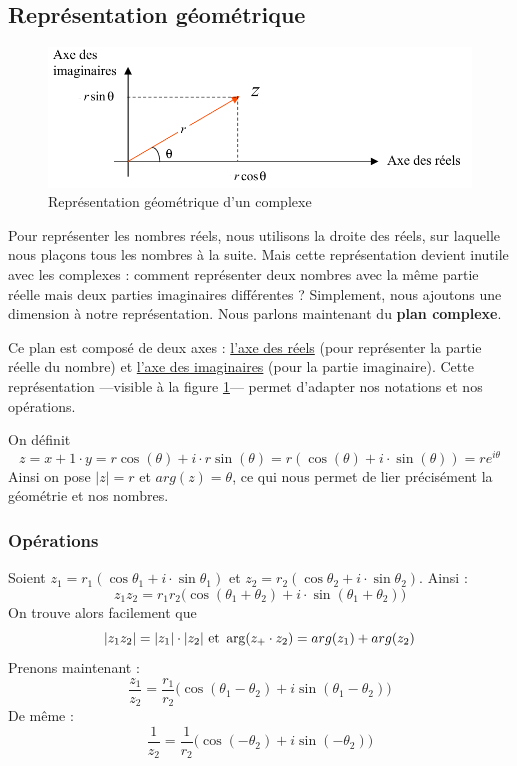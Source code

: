 \documentclass[12pt,a4paper]{article}
\begin{document}
\subsection{Représentation géométrique}
\begin{figure}
	\centering
	\includegraphics[scale=0.5]{images/geo_complexe}
	\caption{Représentation géométrique d'un complexe}
	\label{fig: repres geom complexe}
\end{figure}
Pour représenter les nombres réels, nous utilisons la droite des réels, sur laquelle nous plaçons tous les nombres à la suite. Mais cette représentation devient inutile avec les complexes : comment représenter deux nombres avec la même partie réelle mais deux parties imaginaires différentes ? Simplement, nous ajoutons une dimension à notre représentation. Nous parlons maintenant du \textbf{plan complexe}.

Ce plan est composé de deux axes : \uline{l'axe des réels} (pour représenter la partie réelle du nombre) et \uline{l'axe des imaginaires} (pour la partie imaginaire). Cette représentation ---visible à la figure \ref{fig: repres geom complexe}--- permet d'adapter nos notations et nos opérations.

\begin{boite}
On définit 
\[z = x + 1 \cdot y = r\cos(\theta) + i\cdot r\sin(\theta) = r(\cos(\theta) + i\cdot \sin(\theta)) = re^{i\theta}\]
Ainsi on pose $|z| = r$ et $arg(z) = \theta$, ce qui nous permet de lier précisément la géométrie et nos nombres.
\end{boite}
\subsubsection{Opérations}
Soient $z_1 = r_1(\cos\theta_1 + i\cdot \sin\theta_1)$ et $z_2 = r_2(\cos\theta_2 + i\cdot \sin\theta_2)$. Ainsi :
\begin{equation}
	z_1z_2 = r_1r_2\big(\cos(\theta_1 + \theta_2) + i\cdot \sin(\theta_1 + \theta_2)\big)
\end{equation}
On trouve alors facilement que 
\begin{equation}
	|z_1z_2| = |z_1|\cdot |z_2|  \mbox{ et } \arg(z_+\cdot z_2) = arg(z_1) + arg(z_2)
\end{equation}
Prenons maintenant : 
\begin{equation}
	\frac{z_1}{z_2} = \frac{r_1}{r_2}\big(\cos(\theta_1-\theta_2) + i\sin(\theta_1 - \theta_2)\big)
\end{equation}
De même : 
\begin{equation}
	\frac{1}{z_2} = \frac{1}{r_2}\big(\cos(-\theta_2) + i\sin(-\theta_2)\big)
\end{equation}
\end{document}
